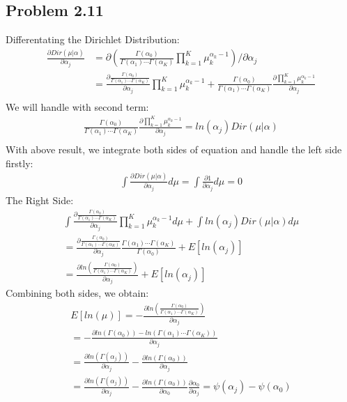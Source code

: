 \documentclass[12pt]{article}
\begin{document}
    \subsection*{Problem 2.11}
    Differentating the Dirichlet Distribution:
    \begin{align*}
        \frac{\partial Dir(\mu|\alpha)}{\partial \alpha_j} & = \partial(\frac{\Gamma(\alpha_0)}{\Gamma(\alpha_1)\cdots\Gamma(\alpha_K)}\prod_{k = 1}^{K}\mu_{k}^{\alpha_k - 1})/\partial\alpha_j\\
        & = \frac{\partial \frac{\Gamma(\alpha_0)}{\Gamma(\alpha_1)\cdots\Gamma(\alpha_K)}}{\partial \alpha_j}\prod_{k = 1}^{K}\mu_{k}^{\alpha_k - 1} +
        \frac{\Gamma(\alpha_0)}{\Gamma(\alpha_1)\cdots\Gamma(\alpha_K)}\frac{\partial \prod_{k = 1}^{K}\mu_{k}^{\alpha_k - 1}}{\partial \alpha_j} \\
    \end{align*}
    We will handle with second term:
    \begin{align*}
        \frac{\Gamma(\alpha_0)}{\Gamma(\alpha_1)\cdots\Gamma(\alpha_K)}\frac{\partial \prod_{k = 1}^{K}\mu_{k}^{\alpha_k - 1}}{\partial \alpha_j} = ln(\alpha_j) Dir(\mu|\alpha) \\
    \end{align*}
    With above result, we integrate both sides of equation and handle the left side firstly:
    \begin{align*}
        \int\frac{\partial Dir(\mu|\alpha)}{\partial \alpha_j} d\mu = \int\frac{\partial 1}{\partial \alpha_j} d\mu = 0
    \end{align*}
    The Right Side:
    \begin{align*}
        \int\frac{\partial \frac{\Gamma(\alpha_0)}{\Gamma(\alpha_1)\cdots\Gamma(\alpha_K)}}{\partial \alpha_j}\prod_{k = 1}^{K}\mu_{k}^{\alpha_k - 1} d\mu+
        \int ln(\alpha_j) Dir(\mu|\alpha) d\mu \\
        = \frac{\partial \frac{\Gamma(\alpha_0)}{\Gamma(\alpha_1)\cdots\Gamma(\alpha_K)}}{\partial \alpha_j}\frac{\Gamma(\alpha_1)\cdots\Gamma(\alpha_K)}{\Gamma(\alpha_0)} + E[ln(\alpha_j)] \\
        = \frac{\partial ln(\frac{\Gamma(\alpha_0)}{\Gamma(\alpha_1)\cdots\Gamma(\alpha_K)})}{\partial \alpha_j} + E[ln(\alpha_j)]
    \end{align*}
    Combining both sides, we obtain:
    \begin{align*}
        E[ln(\mu)] = -\frac{\partial ln(\frac{\Gamma(\alpha_0)}{\Gamma(\alpha_1)\cdots\Gamma(\alpha_K)})}{\partial \alpha_j} \\
        = -\frac{\partial ln(\Gamma(\alpha_0)) - ln(\Gamma(\alpha_1)\cdots\Gamma(\alpha_K))}{\partial \alpha_j} \\
        = \frac{\partial ln(\Gamma(\alpha_j))}{\partial \alpha_j} - \frac{\partial ln(\Gamma(\alpha_0))}{\partial \alpha_j} \\
        = \frac{\partial ln(\Gamma(\alpha_j))}{\partial \alpha_j} - \frac{\partial ln(\Gamma(\alpha_0))}{\partial \alpha_0}\frac{\partial \alpha_0}{\partial \alpha_j}
        = \psi(\alpha_j) - \psi(\alpha_0)
    \end{align*}
\end{document}
